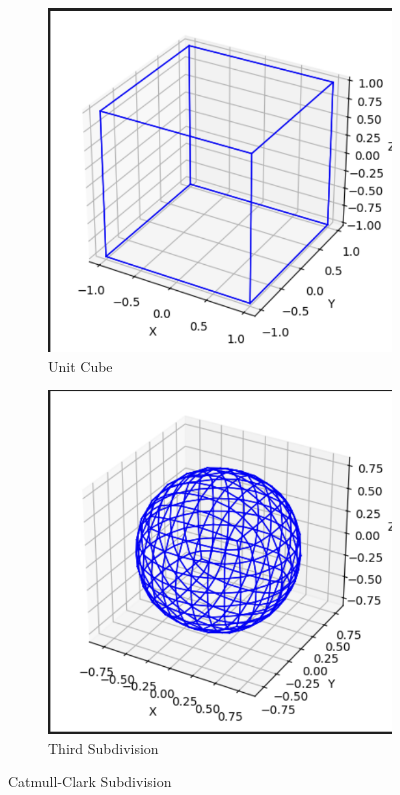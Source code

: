 \documentclass[10pt,a4paper]{article}
\begin{document}
\begin{figure}[H]
\centering
\begin{subfigure}[b]{0.25\textwidth}
    \centering
    \includegraphics[width=\textwidth]{VisualComputingReportResults/CatmullClarkInitialUnitCube}
    \caption{\small Unit Cube}
    \label{fig:cubic}
\end{subfigure}
\hspace{0.2\textwidth}
\begin{subfigure}[b]{0.25\textwidth}
    \centering
    \includegraphics[width=\textwidth]{VisualComputingReportResults/CatmullClarkThirdSubdivision}
    \caption{\small Third Subdivision}
    \label{fig:quartic}
\end{subfigure}
\caption{\small Catmull-Clark Subdivision}
\label{fig:bezier_curves}
\end{figure}
\end{document}
